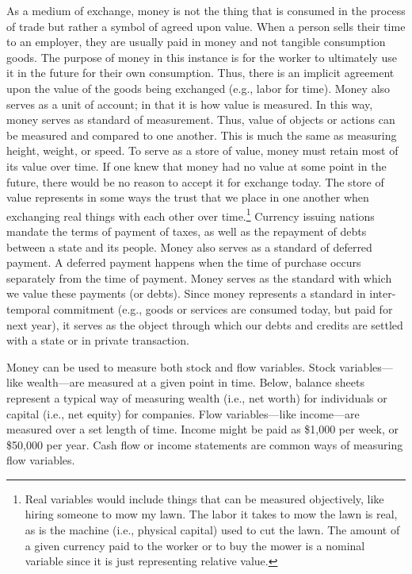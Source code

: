 \documentclass[
]{book}
\begin{document}
As a medium of exchange, money is not the thing that is consumed in the process of trade but rather a symbol of agreed upon value. When a person sells their time to an employer, they are usually paid in money and not tangible consumption goods. The purpose of money in this instance is for the worker to ultimately use it in the future for their own consumption. Thus, there is an implicit agreement upon the value of the goods being exchanged (e.g., labor for time). Money also serves as a unit of account; in that it is how value is measured. In this way, money serves as standard of measurement. Thus, value of objects or actions can be measured and compared to one another. This is much the same as measuring height, weight, or speed. To serve as a store of value, money must retain most of its value over time. If one knew that money had no value at some point in the future, there would be no reason to accept it for exchange today. The store of value represents in some ways the trust that we place in one another when exchanging real things with each other over time.\footnote{Real variables would include things that can be measured objectively, like hiring someone to mow my lawn. The labor it takes to mow the lawn is real, as is the machine (i.e., physical capital) used to cut the lawn. The amount of a given currency paid to the worker or to buy the mower is a nominal variable since it is just representing relative value.} Currency issuing nations mandate the terms of payment of taxes, as well as the repayment of debts between a state and its people. Money also serves as a standard of deferred payment. A deferred payment happens when the time of purchase occurs separately from the time of payment. Money serves as the standard with which we value these payments (or debts). Since money represents a standard in inter-temporal commitment (e.g., goods or services are consumed today, but paid for next year), it serves as the object through which our debts and credits are settled with a state or in private transaction.

Money can be used to measure both stock and flow variables. Stock variables---like wealth---are measured at a given point in time. Below, balance sheets represent a typical way of measuring wealth (i.e., net worth) for individuals or capital (i.e., net equity) for companies. Flow variables---like income---are measured over a set length of time. Income might be paid as \$1,000 per week, or \$50,000 per year. Cash flow or income statements are common ways of measuring flow variables.
\end{document}
